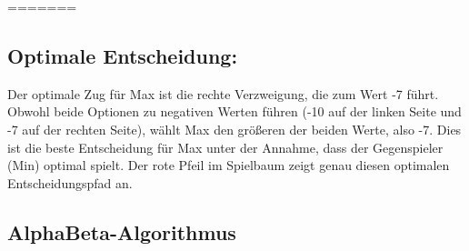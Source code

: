 %
%
%
=======
\subsection*{Optimale Entscheidung:}

Der optimale Zug für Max ist die rechte Verzweigung, die zum Wert -7 führt. Obwohl beide Optionen zu negativen Werten führen (-10 auf der linken Seite und -7 auf der rechten Seite), wählt Max den größeren der beiden Werte, also -7. Dies ist die beste Entscheidung für Max unter der Annahme, dass der Gegenspieler (Min) optimal spielt. Der rote Pfeil im Spielbaum zeigt genau diesen optimalen Entscheidungspfad an.

\subsection{AlphaBeta-Algorithmus}

